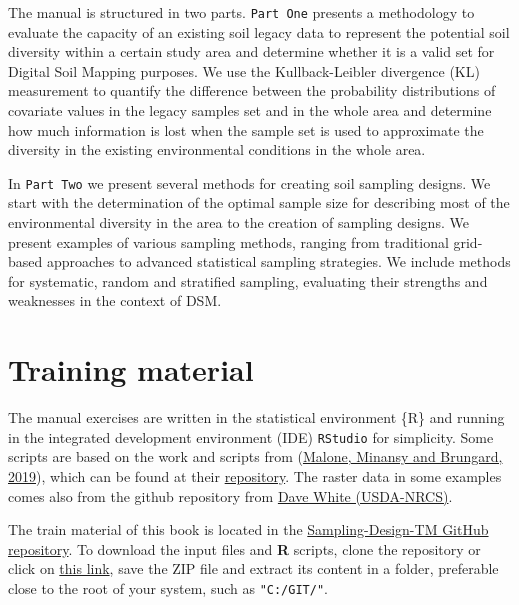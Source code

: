 \documentclass[
  10pt,
  b5paper,
  oneside]{book}
\begin{document}
The manual is structured in two parts. \texttt{\textquotesingle{}Part\ One\textquotesingle{}} presents a methodology to evaluate the capacity of an existing soil legacy data to represent the potential soil diversity within a certain study area and determine whether it is a valid set for Digital Soil Mapping purposes. We use the Kullback-Leibler divergence (KL) measurement to quantify the difference between the probability distributions of covariate values in the legacy samples set and in the whole area and determine how much information is lost when the sample set is used to approximate the diversity in the existing environmental conditions in the whole area.

In \texttt{\textquotesingle{}Part\ Two\textquotesingle{}} we present several methods for creating soil sampling designs. We start with the determination of the optimal sample size for describing most of the environmental diversity in the area to the creation of sampling designs. We present examples of various sampling methods, ranging from traditional grid-based approaches to advanced statistical sampling strategies. We include methods for systematic, random and stratified sampling, evaluating their strengths and weaknesses in the context of DSM.

\hypertarget{training-material}{%
\section{Training material}\label{training-material}}

The manual exercises are written in the statistical environment \{R\} and running in the integrated development environment (IDE) \texttt{RStudio} for simplicity. Some scripts are based on the work and scripts from (\protect\hyperlink{ref-Malone}{Malone, Minansy and Brungard, 2019}), which can be found at their \href{https://bitbucket.org/brendo1001/clhc_sampling/src/master/}{repository}. The raster data in some examples comes also from the github repository from \href{https://github.com/dave-white2/data}{Dave White (USDA-NRCS)}.

The train material of this book is located in the \href{https://github.com/FAO-GSP/Sampling-Design-TM}{Sampling-Design-TM GitHub repository}. To download the input files and \textbf{R} scripts, clone the repository or click on \href{https://github.com/FAO-GSP/Sampling-Design-TM/archive/refs/heads/main.zip}{this link}, save the ZIP file and extract its content in a folder, preferable close to the root of your system, such as \texttt{"C:/GIT/"}.
\end{document}
